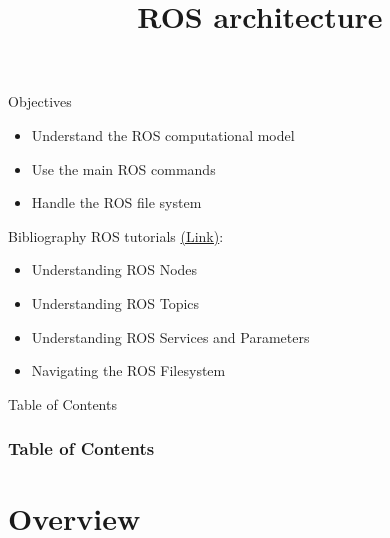 \documentclass[10pt,compress]{beamer} %
\title[ROS architecture]{ROS architecture}
\author{}
\institute{\asignatura}
\date{}
\begin{document}
{\titlepageBlue
    \begin{frame}
        \titlepage
    \end{frame}
}

\begin{frame}[plain]{}
   \begin{block}{Objectives}
       \begin{itemize}
        \item Understand the ROS computational model
        \item Use the main ROS commands
	\item Handle the ROS file system
       \end{itemize}
   \end{block}

   \begin{block}{Bibliography}
       ROS tutorials \href{http://wiki.ros.org/ROS/Tutorials}{(Link)}: 
	\begin{itemize}
	\item Understanding ROS Nodes
	\item Understanding ROS Topics
	\item Understanding ROS Services and Parameters
	\item Navigating the ROS Filesystem
	\end{itemize}
   \end{block}

\end{frame}



{
\eliminarNavegacion
\begin{frame}[shrink]{Table of Contents}
 \frametitle{Table of Contents}
 \tableofcontents
\end{frame}
}

\section{Overview}
\end{document}
